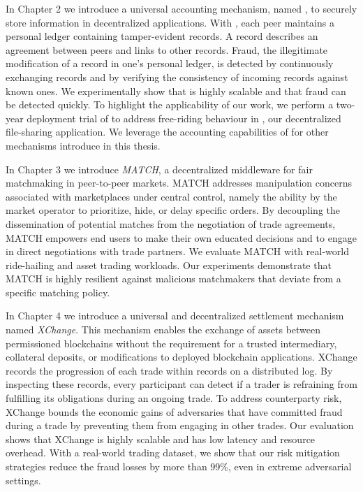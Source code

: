 In Chapter 2 we introduce a universal accounting mechanism, named \emph{\TrustChain{}}, to securely store information in decentralized applications.
With \TrustChain{}, each peer maintains a personal ledger containing tamper-evident records.
A record describes an agreement between peers and links to other records.
Fraud, the illegitimate modification of a record in one's personal ledger, is detected by continuously exchanging records and by verifying the consistency of incoming records against known ones.
We experimentally show that \TrustChain{} is highly scalable and that fraud can be detected quickly.
To highlight the applicability of our work, we perform a two-year deployment trial of \TrustChain{} to address free-riding behaviour in \Tribler{}, our decentralized file-sharing application.
We leverage the accounting capabilities of \TrustChain{} for other mechanisms introduce in this thesis.

In Chapter 3 we introduce \emph{MATCH}, a decentralized middleware for fair matchmaking in peer-to-peer markets.
MATCH addresses manipulation concerns associated with marketplaces under central control, namely the ability by the market operator to prioritize, hide, or delay specific orders.
By decoupling the dissemination of potential matches from the negotiation of trade agreements, MATCH empowers end users to make their own educated decisions and to engage in direct negotiations with trade partners.
We evaluate MATCH with real-world ride-hailing and asset trading workloads.
Our experiments demonstrate that MATCH is highly resilient against malicious matchmakers that deviate from a specific matching policy.

In Chapter 4 we introduce a universal and decentralized settlement mechanism named \emph{XChange}.
This mechanism enables the exchange of assets between permissioned blockchains without the requirement for a trusted intermediary, collateral deposits, or modifications to deployed blockchain applications.
XChange records the progression of each trade within records on a distributed log.
By inspecting these records, every participant can detect if a trader is refraining from fulfilling its obligations during an ongoing trade.
To address counterparty risk, XChange bounds the economic gains of adversaries that have committed fraud during a trade by preventing them from engaging in other trades.
Our evaluation shows that XChange is highly scalable and has low latency and resource overhead.
With a real-world trading dataset, we show that our risk mitigation strategies reduce the fraud losses by more than 99\%, even in extreme adversarial settings.

